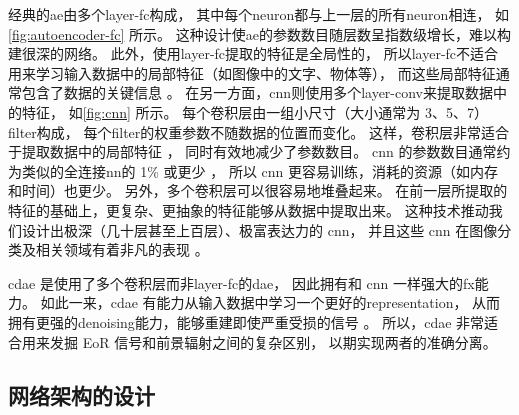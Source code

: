 经典的\ac{ae}由多个\ac{layer-fc}构成，
其中每个\ac{neuron}都与上一层的所有\ac{neuron}相连，
如\autoref{fig:autoencoder-fc} 所示。
这种设计使\ac{ae}的参数数目随层数呈指数级增长，难以构建很深的网络。
此外，使用\ac{layer-fc}提取的特征是全局性的，
所以\ac{layer-fc}不适合用来学习输入数据中的局部特征（如图像中的文字、物体等），
而这些局部特征通常包含了数据的关键信息 \cite{masci2011}。
在另一方面，\ac{cnn}则使用多个\ac{layer-conv}来提取数据中的特征，
如\autoref{fig:cnn} 所示。
每个卷积层由一组小尺寸（大小通常为 3、5、7）\ac{filter}构成，
每个\ac{filter}的权重参数不随数据的位置而变化。
这样，卷积层非常适合于提取数据中的局部特征 \cite{leCun1998}，
同时有效地减少了参数数目。
\ac{cnn} 的参数数目通常约为类似的全连接\ac{nn}的 1\% 或更少 \cite{grais2017}，
所以 \ac{cnn} 更容易训练，消耗的资源（如内存和时间）也更少。
另外，多个卷积层可以很容易地堆叠起来。
在前一层所提取的特征的基础上，更复杂、更抽象的特征能够从数据中提取出来。
这种技术推动我们设计出极深（几十层甚至上百层）、极富表达力的 \ac{cnn}，
并且这些 \ac{cnn} 在图像分类及相关领域有着非凡的表现
\cite{krizhevsky2012,simonyan2014,szegedy2015,ma2019}。

\ac{cdae} 是使用了多个卷积层而非\ac{layer-fc}的\ac{dae}，
因此拥有和 \ac{cnn} 一样强大的\ac{fx}能力。
如此一来，\ac{cdae} 有能力从输入数据中学习一个更好的\ac{representation}，
从而拥有更强的\ac{denoising}能力，能够重建即使严重受损的信号 \cite{du2017}。
所以，\ac{cdae} 非常适合用来发掘 EoR 信号和前景辐射之间的复杂区别，
以期实现两者的准确分离。

\subsection{网络架构的设计}
\label{sec:architecture}

\begin{figure}[htp]
  \centering
\end{figure}

